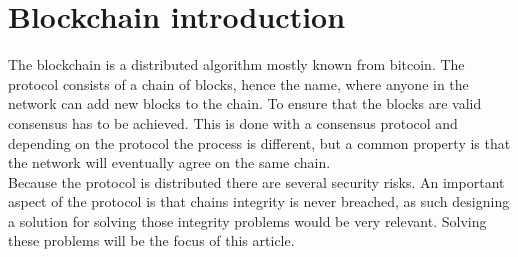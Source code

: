 \section{Blockchain introduction}
The blockchain is a distributed algorithm mostly known from bitcoin. The protocol consists of a chain of blocks, hence the name, where anyone in the network can add new blocks to the chain. To ensure that the blocks are valid consensus has to be achieved. This is done with a consensus protocol and depending on the protocol the process is different, but a common property is that the network will eventually agree on the same chain.\\
Because the protocol is distributed there are several security risks. An important aspect of the protocol is that chains integrity is never breached, as such designing a solution for solving those integrity problems would be very relevant. Solving these problems will be the focus of this article.
